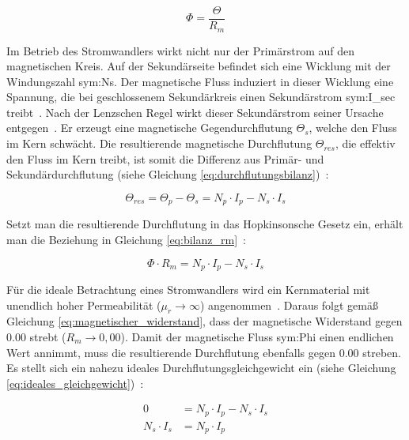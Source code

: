 \begin{equation}
    \Phi = \frac{\Theta}{R_m}
    \label{eq:hopkinson}
\end{equation}

Im Betrieb des Stromwandlers wirkt nicht nur der Primärstrom auf den magnetischen Kreis. Auf der Sekundärseite befindet sich eine Wicklung mit der Windungszahl \gls{sym:Ns}. Der magnetische Fluss induziert in dieser Wicklung eine Spannung, die bei geschlossenem Sekundärkreis einen Sekundärstrom \gls{sym:I_sec} treibt~\cite[S.~67]{book-Technologie_Messwandler-Minkner}. Nach der Lenzschen Regel wirkt dieser Sekundärstrom seiner Ursache entgegen~\cite[S.~20]{pdf-Skript_Induktion-Rolink}. Er erzeugt eine magnetische Gegendurchflutung $\Theta_{s}$, welche den Fluss im Kern schwächt. Die resultierende magnetische Durchflutung $\Theta_{res}$, die effektiv den Fluss im Kern treibt, ist somit die Differenz aus Primär- und Sekundärdurchflutung (siehe Gleichung \eqref{eq:durchflutungsbilanz})~\cite[S.~75]{book-Technologie_Messwandler-Minkner}:

\begin{equation}
    \Theta_{res} = \Theta_{p} - \Theta_{s} = N_{p} \cdot I_{p} - N_{s} \cdot I_{s}
    \label{eq:durchflutungsbilanz}
\end{equation}

Setzt man die resultierende Durchflutung in das Hopkinsonsche Gesetz ein, erhält man die Beziehung in Gleichung \eqref{eq:bilanz_rm}~\cite[Kap.~11.9]{book-Magnetisches_Feld_Moeller-Harriehausen}:

\begin{equation}
    \Phi \cdot R_m = N_{p} \cdot I_{p} - N_{s} \cdot I_{s}
    \label{eq:bilanz_rm}
\end{equation}

Für die ideale Betrachtung eines Stromwandlers wird ein Kernmaterial mit unendlich hoher Permeabilität ($\mu_r \to \infty$) angenommen~\cite[Kap.~11]{book-Magnetisches_Feld_Moeller-Harriehausen}. Daraus folgt gemäß Gleichung \eqref{eq:magnetischer_widerstand}, dass der magnetische Widerstand gegen \num{0,00} strebt ($R_m \to 0,00$). Damit der magnetische Fluss \gls{sym:Phi} einen endlichen Wert annimmt, muss die resultierende Durchflutung ebenfalls gegen \num{0,00} streben. Es stellt sich ein nahezu ideales Durchflutungsgleichgewicht ein (siehe Gleichung \eqref{eq:ideales_gleichgewicht})~\cite[S.~75]{book-Technologie_Messwandler-Minkner}:

\begin{align}
    0                         & = N_{p} \cdot I_{p} - N_{s} \cdot I_{s} \nonumber \\[6pt]
    N_{s} \cdot I_{s} & = N_{p} \cdot I_{p}
    \label{eq:ideales_gleichgewicht}
\end{align}

